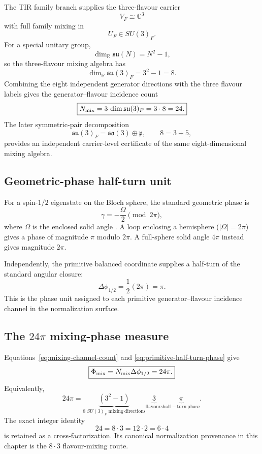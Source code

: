 The TIR family branch supplies the three-flavour carrier
\[
V_F\cong\mathbb C^3
\]
with full family mixing in
\[
U_F\in SU(3)_F.
\]
For a special unitary group,
\[
\dim_{\mathbb R}\mathfrak{su}(N)=N^2-1,
\]
so the three-flavour mixing algebra has
\begin{equation}
\boxed{\dim_{\mathbb R}\mathfrak{su}(3)_F=3^2-1=8.}
\label{eq:su3f-eight-directions}
\end{equation}
Combining the eight independent generator directions with the three flavour
labels gives the generator--flavour incidence count
\begin{equation}
\boxed{
N_{\rm mix}
=3\,\dim\mathfrak{su}(3)_F
=3\cdot8
=24.
}
\label{eq:mixing-channel-count}
\end{equation}
The later symmetric-pair decomposition
\[
\mathfrak{su}(3)_F=\mathfrak{so}(3)\oplus\mathfrak p,
\qquad
8=3+5,
\]
provides an independent carrier-level certificate of the same eight-dimensional
mixing algebra.

\subsection{Geometric-phase half-turn unit}

For a spin-$1/2$ eigenstate on the Bloch sphere, the standard geometric phase is
\begin{equation}
\gamma=-\frac{\Omega}{2}\pmod{2\pi},
\label{eq:berry_spin_half}
\end{equation}
where $\Omega$ is the enclosed solid angle \cite{berry1984}. A loop enclosing a
hemisphere ($|\Omega|=2\pi$) gives a phase of magnitude $\pi$ modulo $2\pi$.
A full-sphere solid angle $4\pi$ instead gives magnitude $2\pi$.

Independently, the primitive balanced coordinate supplies a half-turn of the
standard angular closure:
\begin{equation}
\boxed{
\Delta\phi_{1/2}=\frac12(2\pi)=\pi.
}
\label{eq:primitive-half-turn-phase}
\end{equation}
This is the phase unit assigned to each primitive generator--flavour incidence
channel in the normalization surface.

\subsection{The \(24\pi\) mixing-phase measure}

Equations~\eqref{eq:mixing-channel-count} and
\eqref{eq:primitive-half-turn-phase} give
\begin{equation}
\boxed{
\Phi_{\rm mix}
=N_{\rm mix}\Delta\phi_{1/2}
=24\pi.
}
\label{eq:mixing-phase-measure}
\end{equation}
Equivalently,
\begin{equation}
\boxed{
24\pi
=\underbrace{(3^2-1)}_{8\;SU(3)_F\;\mathrm{mixing\ directions}}
\underbrace{3}_{\mathrm{flavours}}
\underbrace{\pi}_{\mathrm{half\!\!-turn\ phase}}.
}
\label{eq:twentyfour-crossfactor}
\end{equation}
The exact integer identity
\[
24=8\cdot3=12\cdot2=6\cdot4
\]
is retained as a cross-factorization. Its canonical normalization provenance in
this chapter is the $8\cdot3$ flavour-mixing route.

